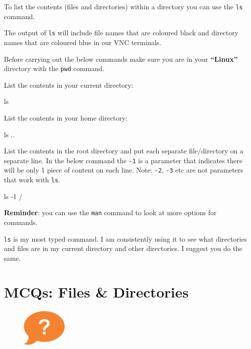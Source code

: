 \documentclass[
  letterpaper,
  DIV=11,
  numbers=noendperiod]{scrreprt}
\newenvironment{Shaded}{\begin{snugshade}}{\end{snugshade}}
\newcommand{\AttributeTok}[1]{\textcolor[rgb]{0.40,0.45,0.13}{#1}}
\newcommand{\FunctionTok}[1]{\textcolor[rgb]{0.28,0.35,0.67}{#1}}
\newcommand{\NormalTok}[1]{\textcolor[rgb]{0.00,0.23,0.31}{#1}}
\begin{document}
To list the contents (files and directories) within a directory you can
use the \texttt{ls} command.

The output of \texttt{ls} will include file names that are coloured
black and directory names that are coloured blue in our VNC terminals.

Before carrying out the below commands make sure you are in your
\textbf{``Linux''} directory with the \texttt{pwd} command.

List the contents in your current directory:

\begin{Shaded}
\begin{Highlighting}[]
\FunctionTok{ls}
\end{Highlighting}
\end{Shaded}

List the contents in your home directory:

\begin{Shaded}
\begin{Highlighting}[]
\FunctionTok{ls}\NormalTok{ ..}
\end{Highlighting}
\end{Shaded}

List the contents in the root directory and put each separate
file/directory on a separate line. In the below command the \texttt{-1}
is a parameter that indicates there will be only 1 piece of content on
each line. Note: \texttt{-2}, \texttt{-3} etc are not parameters that
work with \texttt{ls}.

\begin{Shaded}
\begin{Highlighting}[]
\FunctionTok{ls} \AttributeTok{{-}1}\NormalTok{ /}
\end{Highlighting}
\end{Shaded}

\textbf{Reminder}: you can use the \texttt{man} command to look at more
options for commands.

\texttt{ls} is my most typed command. I am consistently using it to see
what directories and files are in my current directory and other
directories. I suggest you do the same.

\hypertarget{mcqs-files-directories}{%
\section{MCQs: Files \& Directories}\label{mcqs-files-directories}}

\begin{figure}

{\centering \includegraphics[width=0.2\textwidth,height=\textheight]{figures/question_bubble.png}

}

\end{figure}
\end{document}
